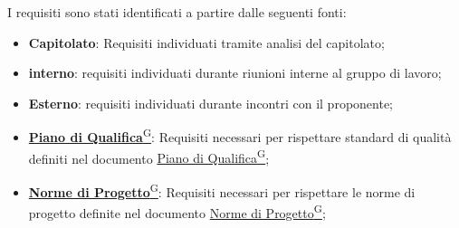 I requisiti sono stati identificati a partire dalle seguenti fonti:
\begin{itemize}
    \item \textbf{Capitolato}: Requisiti individuati tramite analisi del capitolato;
    \item \textbf{interno}: requisiti individuati durante riunioni interne al gruppo di lavoro;
    \item \textbf{Esterno}: requisiti individuati durante incontri con il proponente;
    \item \href{https://code7crusaders.github.io/docs/RTB/documentazione_interna/glossario.html#piano-di-qualifica}{\textbf{Piano di Qualifica}\textsuperscript{G}}: Requisiti necessari per rispettare standard di qualità definiti nel documento \href{https://code7crusaders.github.io/docs/RTB/documentazione_interna/glossario.html#piano-di-qualifica}{Piano di Qualifica\textsuperscript{G}};
    \item \href{https://code7crusaders.github.io/docs/RTB/documentazione_interna/glossario.html#norme-di-progetto}{\textbf{Norme di Progetto}\textsuperscript{G}}: Requisiti necessari per rispettare le norme di progetto definite nel documento \href{https://code7crusaders.github.io/docs/RTB/documentazione_interna/glossario.html#norme-di-progetto}{Norme di Progetto\textsuperscript{G}};
\end{itemize}

